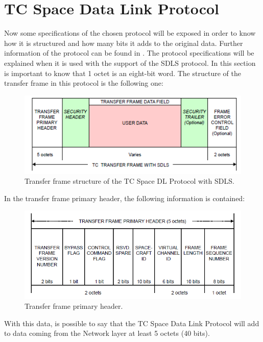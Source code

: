 \documentclass[12pt,a4paper]{report}
\begin{document}
\section{TC Space Data Link Protocol}
Now some specifications of the chosen protocol will be exposed in order to know how it is structured and how many bits it adds to the original data. Further information of the protocol can be found in \cite{CCSDS2010}. The protocol specifications will be explained when it is used with the support of the SDLS protocol. In this section is important to know that 1 octet is an eight-bit word. The structure of the transfer frame in this protocol is the following one: 
\begin{figure}[H]
\begin{center}
\includegraphics[scale=1]{transferfram.PNG}    
\caption{Transfer frame structure of the TC Space DL Protocol with SDLS.}
\end{center}
\end{figure}  
In the transfer frame primary header, the following information is contained:
\begin{figure}[H]
\begin{center}
\includegraphics[scale=1]{transferframeprimaryheader.PNG}   
\caption{Transfer frame primary header.}
\end{center}
\end{figure} 
With this data, is possible to say that the TC Space Data Link Protocol will add to data coming from the Network layer at least 5 octets (40 bits).
\end{document}
